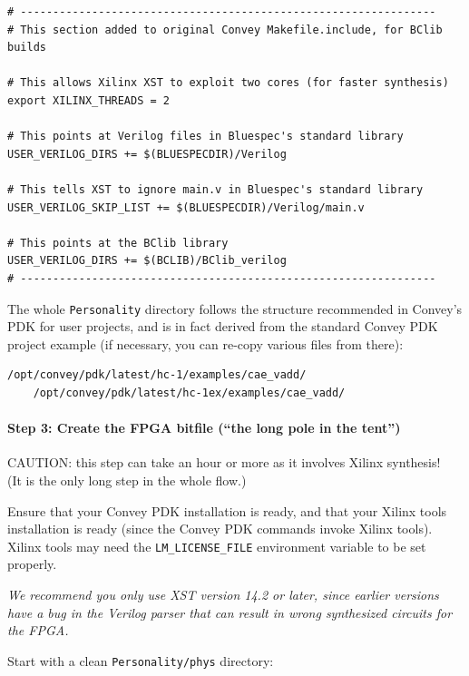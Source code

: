 \documentclass[twoside,letterpaper,11pt]{article}
\newcommand{\hm}{\hspace*{1em}}
\begin{document}
\begin{Verbatim}[frame=single]
# ----------------------------------------------------------------
# This section added to original Convey Makefile.include, for BClib builds

# This allows Xilinx XST to exploit two cores (for faster synthesis)
export XILINX_THREADS = 2

# This points at Verilog files in Bluespec's standard library
USER_VERILOG_DIRS += $(BLUESPECDIR)/Verilog

# This tells XST to ignore main.v in Bluespec's standard library
USER_VERILOG_SKIP_LIST += $(BLUESPECDIR)/Verilog/main.v

# This points at the BClib library
USER_VERILOG_DIRS += $(BCLIB)/BClib_verilog
# ----------------------------------------------------------------
\end{Verbatim}

The whole \verb|Personality| directory follows the structure
recommended in Convey's PDK for user projects, and is in fact derived
from the standard Convey PDK project example (if necessary, you can
re-copy various files from there):

\begin{Verbatim}[frame=single]
    /opt/convey/pdk/latest/hc-1/examples/cae_vadd/
    /opt/convey/pdk/latest/hc-1ex/examples/cae_vadd/
\end{Verbatim}


\paragraph{Step 3: Create the FPGA bitfile (``the long pole in the tent'')}
\hm

CAUTION: this step can take an hour or more as it involves Xilinx
synthesis! \\ (It is the only long step in the whole flow.)

Ensure that your Convey PDK installation is ready, and that your
Xilinx tools installation is ready (since the Convey PDK commands
invoke Xilinx tools).  Xilinx tools may need the
\verb|LM_LICENSE_FILE| environment variable to be set properly.

\emph{We recommend you only use XST version 14.2 or
later, since earlier versions have a bug in the Verilog parser that
can result in wrong synthesized circuits for the FPGA.}

Start with a clean \verb|Personality/phys| directory:
\end{document}
